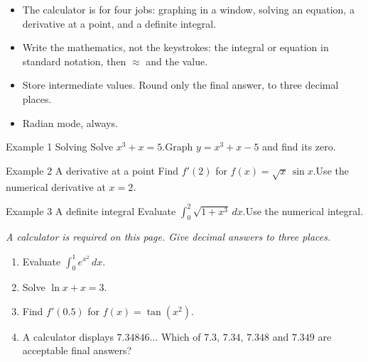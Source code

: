 \documentclass[11pt]{article}
\begin{document}

\begin{ideabox}
\begin{itemize}[leftmargin=*,itemsep=2pt,topsep=2pt]
  \item The calculator is for four jobs: graphing in a window, solving an equation, a derivative at a point, and a definite integral.
  \item Write the mathematics, not the keystrokes: the integral or equation in standard notation, then $\approx$ and the value.
  \item Store intermediate values. Round only the final answer, to three decimal places.
  \item Radian mode, always.
\end{itemize}
\end{ideabox}

\begin{example}{Example 1 \textperiodcentered{} Solving}
Solve $x^3+x=5$.\soln Graph $y=x^3+x-5$ and find its zero.
\end{example}

\begin{example}{Example 2 \textperiodcentered{} A derivative at a point}
Find $f'(2)$ for $f(x)=\sqrt{x}\,\sin x$.\soln Use the numerical derivative at $x=2$.
\end{example}

\begin{example}{Example 3 \textperiodcentered{} A definite integral}
Evaluate $\displaystyle\int_{0}^{2}\sqrt{1+x^3}\,dx$.\soln Use the numerical integral.
\end{example}

\newpage
{}
\emph{A calculator is required on this page. Give decimal answers to three places.}
\begin{enumerate}[leftmargin=*,itemsep=2pt]
  \item Evaluate $\displaystyle\int_{0}^{1}e^{x^2}\,dx$.\work{2.3cm}
  \item Solve $\ln x+x=3$.\work{2.3cm}
  \item Find $f'(0.5)$ for $f(x)=\tan\!\left(x^2\right)$.\work{2.3cm}
  \item A calculator displays $7.34846\ldots$ Which of $7.3$, $7.34$, $7.348$ and $7.349$ are acceptable final answers?\work{2.3cm}
\end{enumerate}
\end{document}
